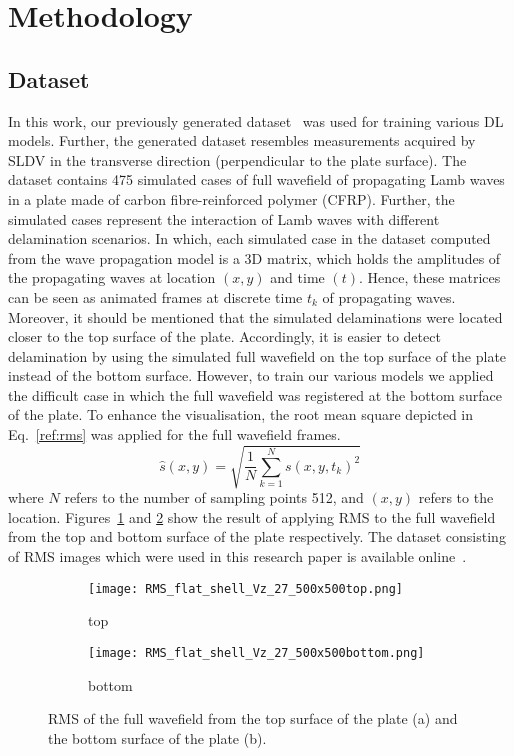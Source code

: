 \section{Methodology}
\label{methodology}
\subsection{Dataset}
In this work, our previously generated dataset~\cite{Ijjeh2021} was used for training various DL models.
Further, the generated dataset resembles measurements acquired by SLDV in the transverse direction (perpendicular to the plate surface).
The dataset contains 475 simulated cases of full wavefield of propagating Lamb waves in a plate made of carbon fibre-reinforced polymer (CFRP).
Further, the simulated cases represent the interaction of Lamb waves with different delamination scenarios.
In which, each simulated case in the dataset computed from the wave propagation model is a 3D matrix, which holds the amplitudes of the propagating waves at location \((x,y)\) and time \((t)\).
Hence, these matrices can be seen as animated frames at discrete time \(t_k\) of propagating waves.
Moreover, it should be mentioned that the simulated delaminations were located closer to the top surface of the plate.
Accordingly, it is easier to detect delamination by using the simulated full wavefield on the top surface of the plate instead of the bottom surface.
However, to train our various models we applied the difficult case in which the full wavefield was registered at the bottom surface of the plate.
To enhance the visualisation, the root mean square depicted in Eq.~\ref{ref:rms} was applied for the full wavefield frames.
\begin{equation}
	\hat{s}(x,y) = \sqrt{\frac{1}{N}\sum_{k=1}^{N} s(x,y,t_k)^2}
	\label{ref:rms}
\end{equation}
where \(N\) refers to the number of sampling points 512,  and \((x,y)\) refers to the location.
Figures~\ref{fig:rmstop} and \ref{fig:rmsbottom} show the result of applying RMS to the full wavefield from the top and bottom surface of the plate respectively.
The dataset consisting of RMS images which were used in this research paper is available online~\cite{Kudela2020d}.
\begin{figure} [h!]
	\centering
	\begin{subfigure}[b]{0.47\textwidth}
		\centering
		\texttt{[image: RMS\_flat\_shell\_Vz\_27\_500x500top.png]}
		\caption{top}
		\label{fig:rmstop}
	\end{subfigure}
	\hfill
	\begin{subfigure}[b]{0.47\textwidth}
		\centering
		\texttt{[image: RMS\_flat\_shell\_Vz\_27\_500x500bottom.png]}
		\caption{bottom}
		\label{fig:rmsbottom}
	\end{subfigure}
	\caption{RMS of the full wavefield from the top surface of the plate (a) and the bottom surface of the plate (b).}
\label{fig:rms}
\end{figure} 
